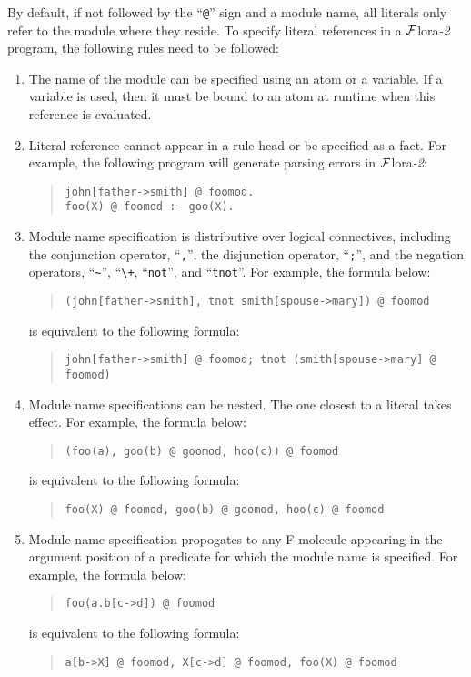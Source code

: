 \documentclass[11pt]{article}
\newcommand{\FLORA}{{\mbox{${\cal F}${\sc lora}\rm\emph{-2}}}\xspace}
\begin{document}
%
By default, if not followed by the ``\verb|@|'' sign and a module
name, all literals only refer to the module where they reside. To specify
literal references in a \FLORA program, the following rules need to be
followed:
\begin{enumerate}
\item The name of the module can be specified using an atom or a variable.
      If a variable is used, then it must be bound to an atom at runtime
      when this reference is evaluated.

\item Literal reference cannot appear in a rule head or be specified as
      a fact. For example, the following program will generate
      parsing errors in \FLORA:
      \begin{quote}
      \verb|john[father->smith] @ foomod.| \\
      \verb|foo(X) @ foomod :- goo(X).|
      \end{quote}

\item Module name specification is distributive over logical connectives,
      including the conjunction operator, ``\verb|,|'', the disjunction operator,
      ``\verb|;|'', and the negation operators, ``\verb|~|'', ``\verb|\+|,
      ``\verb|not|'', and ``\verb|tnot|''. For example, the formula below:
      \begin{quote}
      \verb|(john[father->smith], tnot smith[spouse->mary]) @ foomod|
      \end{quote}
      is equivalent to the following formula:
      \begin{quote}
      \verb|john[father->smith] @ foomod; tnot (smith[spouse->mary] @ foomod)|
      \end{quote}

\item Module name specifications can be nested. The one closest to a literal
      takes effect. For example, the formula below:
      \begin{quote}
      \verb|(foo(a), goo(b) @ goomod, hoo(c)) @ foomod|
      \end{quote}
      is equivalent to the following formula:
      \begin{quote}
      \verb|foo(X) @ foomod, goo(b) @ goomod, hoo(c) @ foomod|
      \end{quote}

\item Module name specification propogates to any F-molecule appearing
      in the argument position of a predicate for which the module name is
      specified. For example, the formula below:
      \begin{quote}
      \verb|foo(a.b[c->d]) @ foomod|
      \end{quote}
      is equivalent to the following formula:
      \begin{quote}
      \verb|a[b->X] @ foomod, X[c->d] @ foomod, foo(X) @ foomod|
      \end{quote}


\end{enumerate}
\end{document}
